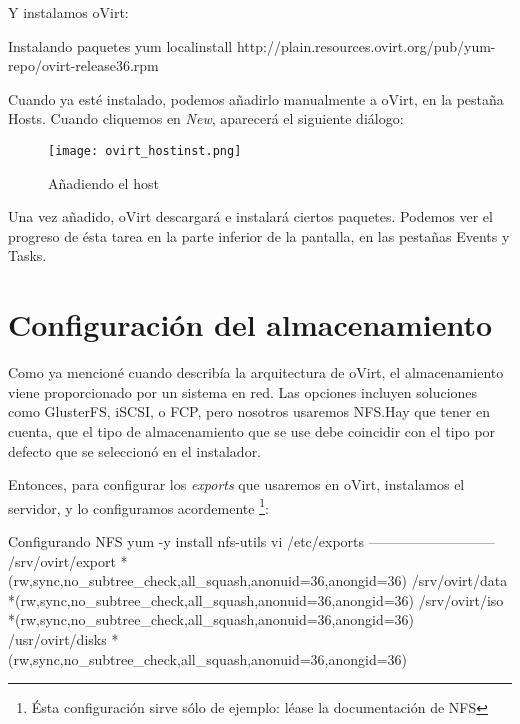 \bigskip

Y instalamos oVirt:

\begin{TMterminal}{}{}{Instalando paquetes}
  yum localinstall http://plain.resources.ovirt.org/pub/yum-repo/ovirt-release36.rpm
\end{TMterminal}

\bigskip

Cuando ya esté instalado, podemos añadirlo manualmente a oVirt, en la pestaña Hosts. Cuando cliquemos en \emph{New}, aparecerá el siguiente diálogo: \clearpage

\begin{figure}[h!]
  \centering
  \texttt{[image: ovirt\_hostinst.png]}
  \caption{\label{fig:ovirthostinst} Añadiendo el host}
\end{figure}

Una vez añadido, oVirt descargará e instalará ciertos paquetes. Podemos ver el progreso de ésta tarea en la parte inferior de la pantalla, en las pestañas Events y Tasks.

\section{Configuración del almacenamiento}
\label{sec:almacenamiento}

Como ya mencioné cuando describía la arquitectura de oVirt, el almacenamiento viene proporcionado por un sistema en red. Las opciones incluyen soluciones como GlusterFS, iSCSI, o FCP, pero nosotros usaremos NFS.\@ Hay que tener en cuenta, que el tipo de almacenamiento que se use debe coincidir con el tipo por defecto que se seleccionó en el instalador.

Entonces, para configurar los \emph{exports} que usaremos en oVirt, instalamos el servidor, y lo configuramos acordemente \footnote{Ésta configuración sirve sólo de ejemplo: léase la documentación de NFS}:

\begin{TMterminal}{}{}{Configurando NFS}
  yum -y install nfs-utils
  vi /etc/exports
---------------------------
/srv/ovirt/export  *(rw,sync,no_subtree_check,all_squash,anonuid=36,anongid=36)
/srv/ovirt/data    *(rw,sync,no_subtree_check,all_squash,anonuid=36,anongid=36)
/srv/ovirt/iso     *(rw,sync,no_subtree_check,all_squash,anonuid=36,anongid=36)
/usr/ovirt/disks   *(rw,sync,no_subtree_check,all_squash,anonuid=36,anongid=36)
\end{TMterminal}

